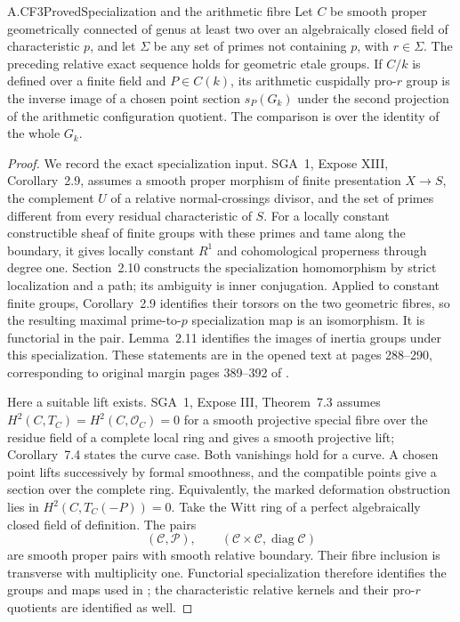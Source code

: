 \begin{claim}{A.CF3}{Proved}{Specialization and the arithmetic fibre}
Let $C$ be smooth proper geometrically connected of genus at least two
over an algebraically closed field of characteristic $p$, and let
$\Sigma$ be any set of primes not containing $p$, with $r\in\Sigma$.
The preceding relative exact sequence holds for geometric etale groups.
If $C/k$ is defined over a finite field and $P\in C(k)$, its arithmetic
cuspidally pro-$r$ group is the inverse image of a chosen point section
$s_P(G_k)$ under the second projection of the arithmetic configuration
quotient. The comparison is over the identity of the whole $G_k$.
\end{claim}
\begin{proof}
We record the exact specialization input. SGA~1, Expose XIII,
Corollary~2.9, assumes a smooth proper morphism of finite presentation
$X\to S$, the complement $U$ of a relative normal-crossings divisor,
and the set of primes different from every residual characteristic of
$S$. For a locally constant constructible sheaf of finite groups with
these primes and tame along the boundary, it gives locally constant
$R^1$ and cohomological properness through degree one. Section~2.10
constructs the specialization homomorphism by strict localization and
a path; its ambiguity is inner conjugation. Applied to constant finite
groups, Corollary~2.9 identifies their torsors on the two geometric
fibres, so the resulting maximal prime-to-$p$ specialization map is an
isomorphism. It is functorial in the pair. Lemma~2.11 identifies the
images of inertia groups under this specialization. These statements
are in the opened text at pages 288--290, corresponding to original
margin pages 389--392 of \cite{SGA1}.

Here a suitable lift exists. SGA~1, Expose III, Theorem~7.3 assumes
$H^2(C,T_C)=H^2(C,\mathcal O_C)=0$ for a smooth projective special
fibre over the residue field of a complete local ring and gives a
smooth projective lift; Corollary~7.4 states the curve case. Both
vanishings hold for a curve. A chosen point lifts successively by
formal smoothness, and the compatible points give a section over the
complete ring. Equivalently, the marked deformation obstruction lies
in $H^2(C,T_C(-P))=0$. Take the Witt ring of a perfect algebraically
closed field of definition. The pairs
\[
 (\mathcal C,\mathcal P),\qquad
 (\mathcal C\times\mathcal C,\operatorname{diag}\mathcal C)
\]
are smooth proper pairs with smooth relative boundary. Their fibre
inclusion is transverse with multiplicity one. Functorial
specialization therefore identifies the groups and maps used in
; the characteristic relative kernels and their
pro-$r$ quotients are identified as well.


\end{proof}
